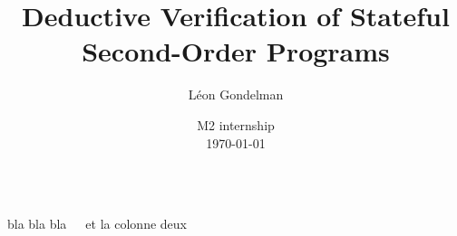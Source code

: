 \documentclass{beamer}
\begin{document}
\title{Deductive Verification of Stateful Second-Order Programs}
\author{Léon Gondelman}
\date{M2 internship \\ \today}

\begin{frame}
  \maketitle
\end{frame}


\begin{frame}\frametitle{}
\end{frame}

\begin{frame}\frametitle{}
  \begin{columns}

  bla bla bla


  et la colonne deux
  \end{columns}
\end{frame}

\begin{frame}\frametitle{}
\end{frame}



\begin{frame}\frametitle{}
\end{frame}

\begin{frame}\frametitle{}
\end{frame}

\begin{frame}\frametitle{}
\end{frame}






\end{document}
